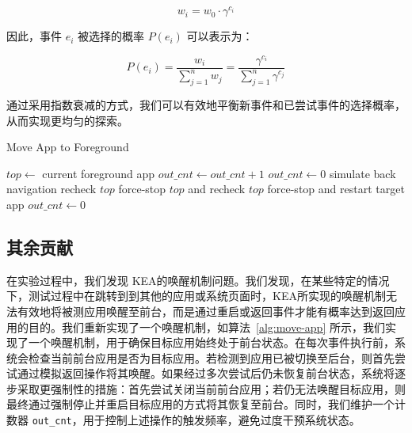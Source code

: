 \documentclass[twocolumn, 10pt]{article}
\newcommand{\kea}{K{\small\MakeUppercase{ea}}}
\begin{document}
\begin{equation}
    w_i = w_0 \cdot \gamma^{c_i}
\end{equation}

因此，事件 $e_i$ 被选择的概率 $P(e_i)$ 可以表示为：

\begin{equation}
    P(e_i) = \frac{w_i}{\sum_{j=1}^{n} w_j} = \frac{\gamma^{c_i}}{\sum_{j=1}^{n} \gamma^{c_j}}
\end{equation}

通过采用指数衰减的方式，我们可以有效地平衡新事件和已尝试事件的选择概率，从而实现更均匀的探索。

\begin{algorithm}[t]
\caption{Move App to Foreground}
\label{alg:move-app}
\begin{algorithmic}[1]
    \State $top \gets$ current foreground app
        \State $out\_cnt \gets out\_cnt + 1$
            \State $out\_cnt \gets 0$
            \State simulate back navigation
            \State recheck $top$
                \State force-stop $top$ and recheck $top$
                    \State force-stop and restart target app
                \EndIf
            \EndIf
        \EndIf
    \Else
        \State $out\_cnt \gets 0$
    \EndIf
\EndFunction
\end{algorithmic}
\end{algorithm}

\subsection{其余贡献}
\label{sec:other}

在实验过程中，我们发现 \kea 的唤醒机制问题。我们发现，在某些特定的情况下，测试过程中在跳转到到其他的应用或系统页面时，\kea 所实现的唤醒机制无法有效地将被测应用唤醒至前台，而是通过重启或返回事件才能有概率达到返回应用的目的。我们重新实现了一个唤醒机制，如算法~\ref{alg:move-app} 所示，我们实现了一个唤醒机制，用于确保目标应用始终处于前台状态。在每次事件执行前，系统会检查当前前台应用是否为目标应用。若检测到应用已被切换至后台，则首先尝试通过模拟返回操作将其唤醒。如果经过多次尝试后仍未恢复前台状态，系统将逐步采取更强制性的措施：首先尝试关闭当前前台应用；若仍无法唤醒目标应用，则最终通过强制停止并重启目标应用的方式将其恢复至前台。同时，我们维护一个计数器 \texttt{out\_cnt}，用于控制上述操作的触发频率，避免过度干预系统状态。
\end{document}
